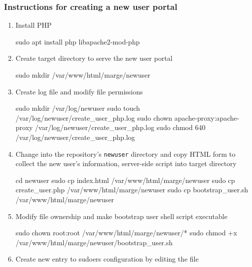 

\subsubsection*{Instructions for creating a new user portal}

\begin{enumerate}
    \item Install PHP 
    \begin{terminal}
        sudo apt install php libapache2-mod-php
    \end{terminal}
    \item Create target directory to serve the new user portal
    \begin{terminal}
        sudo mkdir /var/www/html/marge/newuser
    \end{terminal}
    \item Create log file and modify file permissions
    \begin{terminal}
        sudo mkdir /var/log/newuser
        sudo touch /var/log/newuser/create_user_php.log
        sudo chown apache-proxy:apache-proxy /var/log/newuser/create_user_php.log
        sudo chmod 640 /var/log/newuser/create_user_php.log
    \end{terminal}
    \item Change into the repository's \texttt{newuser} directory and copy HTML
    form to collect the new user's information, server-side script into target
    directory
    \begin{terminal}
        cd newuser
        sudo cp index.html /var/www/html/marge/newuser
        sudo cp create_user.php /var/www/html/marge/newuser
        sudo cp bootstrap_user.sh /var/www/html/marge/newuser
    \end{terminal}
    \item Modify file ownership and make bootstrap user shell script executable
    \begin{terminal}
        sudo chown root:root /var/www/html/marge/newuser/*
        sudo chmod +x /var/www/html/marge/newuser/bootstrap_user.sh
    \end{terminal}
    \item Create new entry to sudoers configuration by editing the file
    \begin{terminal}

\end{terminal}
\end{enumerate}
